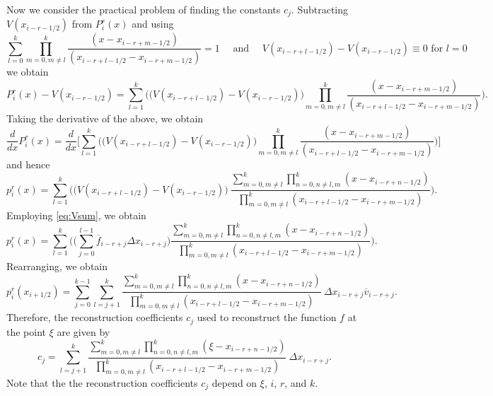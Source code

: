 \documentclass{article}
\newcommand{\dd}[2]{\frac{d #1}{d #2}}
\newcommand{\xri}[0]{x_{i+1/2}}
\numberwithin{equation}{section}
\begin{document}
Now we consider the practical problem of finding the constants $c_j$.
Subtracting $V(x_{i-r-1/2})$ from $P^r_i(x)$ and using
\begin{equation*}
  \sum_{l=0}^{k} \prod_{m=0, m \neq l}^{k}
    \frac{(x - x_{i-r+m-1/2})}{(x_{i-r+l-1/2} - x_{i-r+m-1/2})} = 1
  \quad \text{ and } \quad
  V(x_{i-r+l-1/2}) - V(x_{i-r-1/2}) \equiv 0 \text{ for } l = 0
\end{equation*}
we obtain
\begin{equation*}
  P^r_i(x) - V(x_{i-r-1/2}) = \sum_{l=1}^{k} \Biggl(
    \bigl( V(x_{i-r+l-1/2}) - V(x_{i-r-1/2}) \bigr)
    \prod_{m=0, m \neq l}^{k}
      \frac{(x - x_{i-r+m-1/2})}{(x_{i-r+l-1/2} - x_{i-r+m-1/2})}
      \Biggr).
\end{equation*}
Taking the derivative of the above, we obtain
\begin{equation*}
  \dd{}{x}P^r_i(x) = \dd{}{x} \Biggl[ \sum_{l=1}^{k} \Biggl(
    \bigl( V(x_{i-r+l-1/2}) - V(x_{i-r-1/2}) \bigr) \prod_{m=0, m \neq l}^{k}
      \frac{(x - x_{i-r+m-1/2})}{(x_{i-r+l-1/2} - x_{i-r+m-1/2})}
      \Biggr) \Biggr]
\end{equation*}
and hence
\begin{equation}
  p^r_i(x) = \sum_{l=1}^{k} \Biggl(
  \bigl( V(x_{i-r+l-1/2}) - V(x_{i-r-1/2}) \bigr) \
    \frac{\sum_{m=0, m \neq l}^{k} \prod_{n=0, n \neq l,m}^{k}
      (x - x_{i-r+n-1/2})}{\prod_{m=0, m \neq l}^{k}
      (x_{i-r+l-1/2} - x_{i-r+m-1/2})} \Biggr). \label{eq:pV}
\end{equation}
Employing \eqref{eq:Vsum}, we obtain
\begin{equation}
  p^r_i(x) = \sum_{l=1}^{k} \Biggl(
  \biggl( \sum_{j=0}^{l-1} \overline{f}_{i-r+j} \Delta x_{i-r+j} \biggr)
  \frac{\sum_{m=0, m \neq l}^{k} \prod_{n=0, n \neq l,m}^{k}
    (x - x_{i-r+n-1/2})}{\prod_{m=0, m \neq l}^{k}
    (x_{i-r+l-1/2} - x_{i-r+m-1/2})} \Biggr).
\end{equation}
Rearranging, we obtain
\begin{equation*}
  p^r_i(\xri) = \sum_{j=0}^{k-1} \sum_{l=j+1}^k
  \frac{\sum_{m=0, m \neq l}^{k} \prod_{n=0, n \neq l,m}^{k}
    (x - x_{i-r+n-1/2})}{\prod_{m=0, m \neq l}^{k}
    (x_{i-r+l-1/2} - x_{i-r+m-1/2})} \ \Delta x_{i-r+j} \overline{v}_{i-r+j}.
\end{equation*}
Therefore, the reconstruction coefficients $c_j$ used to reconstruct
the function $f$ at the point $\xi$ are given by
\begin{equation}
  c_j = \sum_{l=j+1}^k \frac{\sum_{m=0, m \neq l}^{k}
    \prod_{n=0, n \neq l,m}^{k} (\xi - x_{i-r+n-1/2})}{
    \prod_{m=0, m \neq l}^{k} (x_{i-r+l-1/2} - x_{i-r+m-1/2})}
    \ \Delta x_{i-r+j}.
\end{equation}
Note that the the reconstruction coefficients $c_j$ depend on $\xi$,
$i$, $r$, and $k$.
\end{document}
